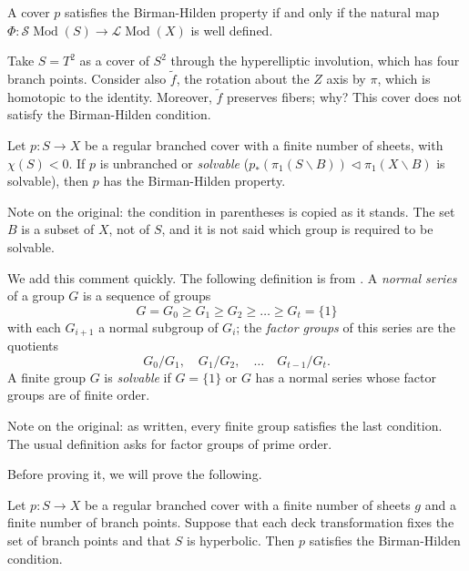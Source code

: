 \begin{remark}
\label{remark-well-defined}
A cover $p$ satisfies the Birman-Hilden
property if and only if the natural map
$\Phi:\mathcal{S}\operatorname{Mod}(S)
\to\mathcal{L}\operatorname{Mod}(X)$
is well defined.
\end{remark}

\begin{example}
\label{example-torus-fails}
Take $S=T^2$ as a cover of $S^2$ through
the hyperelliptic involution, which has
four branch points. Consider also
$\tilde{f}$, the rotation about the $Z$
axis by $\pi$, which is homotopic to the
identity. Moreover, $\tilde{f}$
preserves fibers; why? This cover does
not satisfy the Birman-Hilden condition.
\end{example}

\begin{theorem}
\label{theorem-birman-hilden}
Let $p:S\to X$ be a regular branched
cover with a finite number of sheets,
with $\chi(S)<0$. If $p$ is unbranched
or {\it solvable}
($p_*(\pi_1(S\backslash B))
\triangleleft\pi_1(X\backslash B)$
is solvable), then $p$ has the
Birman-Hilden property.
\end{theorem}

Note on the original: the condition in
parentheses is copied as it stands. The
set $B$ is a subset of $X$, not of $S$,
and it is not said which group is
required to be solvable.

We add this comment quickly. The
following definition is from
\cite[p.~464]{rotman-abstract-algebra}.
A {\it normal series} of a group $G$ is
a sequence of groups
$$
G=G_0\geq G_1\geq G_2\geq\ldots
\geq G_t=\{1\}
$$
with each $G_{i+1}$ a normal subgroup of
$G_i$; the {\it factor groups} of this
series are the quotients
$$
G_0/G_1,\quad G_1/G_2,\quad\ldots
\quad G_{t-1}/G_t.
$$
A finite group $G$ is {\it solvable} if
$G=\{1\}$ or $G$ has a normal series
whose factor groups are of finite order.

Note on the original: as written, every
finite group satisfies the last
condition. The usual definition asks
for factor groups of prime order.

Before proving it, we will prove the
following.

\begin{theorem}
\label{theorem-birman-hilden-fixed}
Let $p:S\to X$ be a regular branched
cover with a finite number of sheets $g$
and a finite number of branch points.
Suppose that each deck transformation
fixes the set of branch points and that
$S$ is hyperbolic. Then $p$ satisfies
the Birman-Hilden condition.
\end{theorem}

